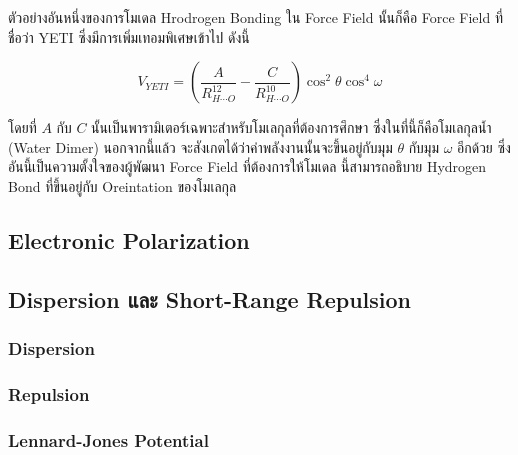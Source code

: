 ตัวอย่างอันหนึ่งของการโมเดล Hrodrogen Bonding ใน Force Field นั้นก็คือ Force Field ที่ชื่อว่า YETI ซึ่งมีการเพิ่มเทอมพิเศษเข้าไป ดังนี้ 

\begin{equation}
    V_{YETI}
    =
    \left(
        \frac{A}{R^{12}_{H \cdots O}} 
        - \frac{C}{R^{10}_{H \cdots O}} 
    \right)
    \cos^{2} \theta 
    \cos^{4} \omega
\end{equation}

\noindent โดยที่ $A$ กับ $C$ นั้นเป็นพารามิเตอร์เฉพาะสำหรับโมเลกุลที่ต้องการศึกษา ซึ่งในที่นี้ก็คือโมเลกุลน้ำ (Water Dimer) นอกจากนี้แล้ว%
จะสังเกตได้ว่าค่าพลังงานนั้นจะขึ้นอยู่กับมุม $\theta$ กับมุม $\omega$ อีกด้วย ซึ่งอันนี้เป็นความตั้งใจของผู้พัฒนา Force Field ที่ต้องการให้โมเดล%
นี้สามารถอธิบาย Hydrogen Bond ที่ขึ้นอยู่กับ Oreintation ของโมเลกุล 

\subsection{Electronic Polarization}

\subsection{Dispersion และ Short-Range Repulsion}

\subsubsection{Dispersion}

\subsubsection{Repulsion}

\subsubsection{Lennard-Jones Potential}

